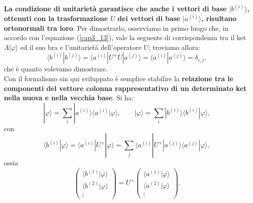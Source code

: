 \textbf{La condizione di unitarietà garantisce che anche i vettori di base $| b^{(i)} \rangle $, ottenuti con la trasformazione $U$ dei vettori di base $| a^{(i)} \rangle $, risultano ortonormali tra loro}. Per dimostrarlo, osserviamo in primo luogo che, in accordo con l'equazione (\ref{cap3_13}), vale la seguente di corrispondenza tra il ket $A | \varphi \rangle $ ed il suo bra e l'unitarietà dell'operatore $U$; troviamo allora:
	\begin{equation}
	\langle b^{(i)} | b^{(j)} \rangle = \langle a^{(i)} | U^{+}U | a^{(j)} \rangle = \langle a^{(i)} |  a^{(j)} \rangle = \delta_{i,j} ,
	\end{equation}
che è quanto volevamo dimostrare.\\

Con il formalismo sin qui sviluppato è semplice stabilire la \textbf{relazione tra le componenti del vettore colonna rappresentativo di un determinato ket nella nuova e nella vecchia base}. Si ha:
	\begin{equation}
		\boxed{
			| \varphi \rangle = \sum \limits_{i}  | a^{(i)} \rangle \langle a^{(i)} | \varphi  \rangle , \qquad
			| \varphi \rangle = \sum \limits_{i}  | b^{(i)} \rangle \langle b^{(i)} | \varphi \rangle ,
			}
	\end{equation}
con
	\begin{equation}
		\boxed{
			\langle b^{(i)} | \varphi \rangle = \langle a^{(i)} |  U^+ | \varphi \rangle = \sum \limits_{j} \langle a^{(i)} | U^+ | a^{(j)}\rangle \langle a^{(j)} | \varphi \rangle ,
			}
	\end{equation}
ossia
	\begin{equation}
		\boxed{
			\begin{pmatrix}
			\langle b^{(1)} | \varphi \rangle \\
			\langle b^{(2)} | \varphi \rangle \\
			\vdots 
			\end{pmatrix} = U^+
			\begin{pmatrix}
			\langle a^{(1)} | \varphi \rangle \\
			\langle a^{(2)} | \varphi \rangle \\
			\vdots 
			\end{pmatrix} .
			}
	\end{equation}

